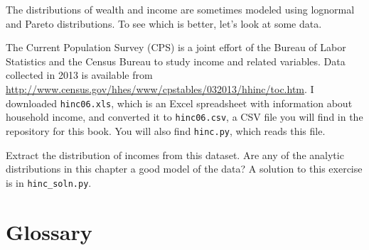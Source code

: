 \documentclass[12pt]{book}
\begin{document}
\begin{exercise}
\label{income}

The distributions of wealth and income are sometimes modeled using
lognormal and Pareto distributions.  To see which is better, let's
look at some data.

The Current Population Survey (CPS) is a joint effort of the Bureau
of Labor Statistics and the Census Bureau to study income and related
variables.  Data collected in 2013 is available from
\url{http://www.census.gov/hhes/www/cpstables/032013/hhinc/toc.htm}.
I downloaded {\tt hinc06.xls}, which is an Excel spreadsheet with
information about household income, and converted it to {\tt hinc06.csv},
a CSV file you will find in the repository for this book.  You
will also find {\tt hinc.py}, which reads this file.

Extract the distribution of incomes from this dataset.  Are any of the
analytic distributions in this chapter a good model of the data?  A
solution to this exercise is in \verb"hinc_soln.py".

\end{exercise}




\section{Glossary}
\end{document}
